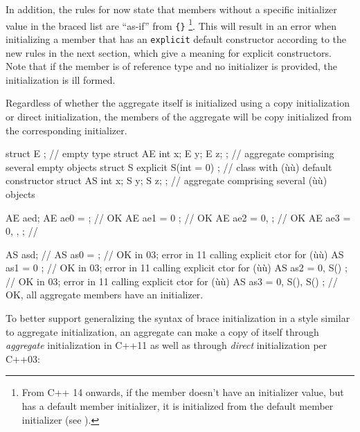 \noindent In addition, the rules for  now state that
members without a specific initializer value in the braced list are
``as-if''  from \lstinline!{}!
{\cprotect\footnote{From C++ 14 onwards, if the member doesn't have an
initializer value, but has a default member initializer, it is
initialized from the default member initializer (see ).}}. This will result in an error when
initializing a member that has an \lstinline!explicit! default constructor
according to the new  rules in
the next section, which give a meaning for explicit constructors. Note
that if the member is of reference type and no initializer is provided,
the initialization is ill formed.

Regardless of whether the aggregate itself is initialized using a copy
initialization or direct initialization, the members of the aggregate
will be copy initialized from the corresponding initializer.

\begin{emcppslisting}
struct E { };                         // empty type
struct AE { int x; E y; E z; };       // aggregate comprising several empty objects
struct S { explicit S(int = 0) {} };  // class with (ù{}ù) default constructor
struct AS{ int x; S y; S z; };        // aggregate comprising several (ù{}ù) objects

AE aed;
AE ae0 = {};               // OK
AE ae1 = { 0 };            // OK
AE ae2 = { 0, {} };        // OK
AE ae3 = { 0, {}, {} };    //

AS asd;                    //
AS as0 = {};               // OK in 03; error in 11 calling explicit ctor for (ù{}ù)
AS as1 = { 0 };            // OK in 03; error in 11 calling explicit ctor for (ù{}ù)
AS as2 = { 0, S() };       // OK in 03; error in 11 calling explicit ctor for (ù{}ù)
AS as3 = { 0, S(), S() };  // OK, all aggregate members have an initializer.
\end{emcppslisting}


\noindent To better support generalizing the syntax of brace initialization in a
style similar to aggregate initialization, an aggregate can make a copy
of itself through \emph{aggregate} initialization in C++11 as well as
through \emph{direct} initialization per C++03:

